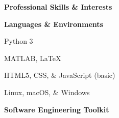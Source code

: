\documentclass[letterpaper,final]{memoir}
\newcommand{\LargeSep}{\vspace{1.3em}}
\newcommand{\Sep}{\vspace{1.0em}}
\newcommand{\SmallSep}{\vspace{0.4em}}
\newcommand{\CVSection}[1]
	{\LARGE\textbf{#1}\par
	\SmallSep\normalsize}
\newcommand{\CVItem}[1]
	{\textbf{\color{Blue} #1}}
\begin{document}
\LargeSep

\newpage


\notoserif \CVSection{Professional Skills \& Interests}
\normalfont
\SmallSep

\CVItem{Languages \& Environments}
\Sep

\begin{multicols}{1}

    \begin{compactitem}[\color{Blue}$\circ$]
		
		\item Python 3
        \SmallSep
        \item MATLAB, LaTeX
		\SmallSep
        \item HTML5, CSS, \& JavaScript (basic)
        \SmallSep
        \item Linux, macOS, \& Windows
        
	\end{compactitem}

\end{multicols}

\Sep

\CVItem{Software Engineering Toolkit}
\Sep
\end{document}
